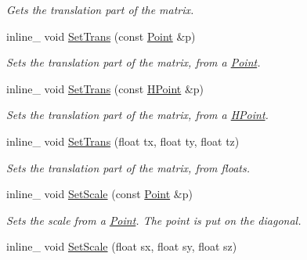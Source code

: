 \begin{DoxyCompactItemize}
\begin{DoxyCompactList}\small\item\em Gets the translation part of the matrix. \end{DoxyCompactList}\item 
inline\+\_\+ void \hyperlink{classOpcode_1_1Matrix4x4_a4b57405612d002dac2a15dd524200b19}{Set\+Trans} (const \hyperlink{classOpcode_1_1Point}{Point} \&p)\hypertarget{classOpcode_1_1Matrix4x4_a4b57405612d002dac2a15dd524200b19}{}\label{classOpcode_1_1Matrix4x4_a4b57405612d002dac2a15dd524200b19}

\begin{DoxyCompactList}\small\item\em Sets the translation part of the matrix, from a \hyperlink{classOpcode_1_1Point}{Point}. \end{DoxyCompactList}\item 
inline\+\_\+ void \hyperlink{classOpcode_1_1Matrix4x4_a8b9234c6dcee1411eaa6064ba4098735}{Set\+Trans} (const \hyperlink{classOpcode_1_1HPoint}{H\+Point} \&p)\hypertarget{classOpcode_1_1Matrix4x4_a8b9234c6dcee1411eaa6064ba4098735}{}\label{classOpcode_1_1Matrix4x4_a8b9234c6dcee1411eaa6064ba4098735}

\begin{DoxyCompactList}\small\item\em Sets the translation part of the matrix, from a \hyperlink{classOpcode_1_1HPoint}{H\+Point}. \end{DoxyCompactList}\item 
inline\+\_\+ void \hyperlink{classOpcode_1_1Matrix4x4_aa05a8e815fff5b0caf208fa18a1a5cb0}{Set\+Trans} (float tx, float ty, float tz)\hypertarget{classOpcode_1_1Matrix4x4_aa05a8e815fff5b0caf208fa18a1a5cb0}{}\label{classOpcode_1_1Matrix4x4_aa05a8e815fff5b0caf208fa18a1a5cb0}

\begin{DoxyCompactList}\small\item\em Sets the translation part of the matrix, from floats. \end{DoxyCompactList}\item 
inline\+\_\+ void \hyperlink{classOpcode_1_1Matrix4x4_a5c5ce08ab67a260f112d12f56de65f89}{Set\+Scale} (const \hyperlink{classOpcode_1_1Point}{Point} \&p)\hypertarget{classOpcode_1_1Matrix4x4_a5c5ce08ab67a260f112d12f56de65f89}{}\label{classOpcode_1_1Matrix4x4_a5c5ce08ab67a260f112d12f56de65f89}

\begin{DoxyCompactList}\small\item\em Sets the scale from a \hyperlink{classOpcode_1_1Point}{Point}. The point is put on the diagonal. \end{DoxyCompactList}\item 
inline\+\_\+ void \hyperlink{classOpcode_1_1Matrix4x4_ae0e13debedf3c48b2c8fa692509469f1}{Set\+Scale} (float sx, float sy, float sz)\hypertarget{classOpcode_1_1Matrix4x4_ae0e13debedf3c48b2c8fa692509469f1}{}\label{classOpcode_1_1Matrix4x4_ae0e13debedf3c48b2c8fa692509469f1}


\end{DoxyCompactItemize}
